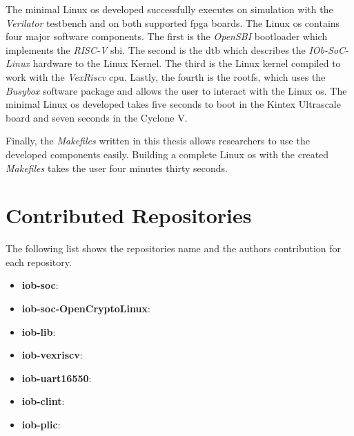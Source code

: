 The minimal Linux \acrshort{os} developed successfully executes on simulation with the \textit{Verilator} testbench and on both supported \acrshort{fpga} boards. The Linux \acrshort{os} contains four major software components. The first is the \textit{OpenSBI} bootloader which implements the \textit{RISC-V} \acrshort{sbi}. The second is the \acrlong{dtb} which describes the \textit{IOb-SoC-Linux} hardware to the Linux Kernel. The third is the Linux kernel compiled to work with the \textit{VexRiscv} \acrshort{cpu}. Lastly, the fourth is the \acrlong{rootfs}, which uses the \textit{Busybox} software package and allows the user to interact with the Linux \acrshort{os}. The minimal Linux \acrshort{os} developed takes five seconds to boot in the Kintex Ultrascale board and seven seconds in the Cyclone V.

Finally, the \textit{Makefiles} written in this thesis allows researchers to use the developed components easily. Building a complete Linux \acrshort{os} with the created \textit{Makefiles} takes the user four minutes thirty seconds.

\section{Contributed Repositories}
\label{section:contributions}
The following list shows the repositories name and the authors contribution for each repository.

\begin{itemize}
    \item \textbf{iob-soc}: 
    \item \textbf{iob-soc-OpenCryptoLinux}: 
    \item \textbf{iob-lib}: 
    \item \textbf{iob-vexriscv}: 
    \item \textbf{iob-uart16550}: 
    \item \textbf{iob-clint}: 
    \item \textbf{iob-plic}: 
\end{itemize}

